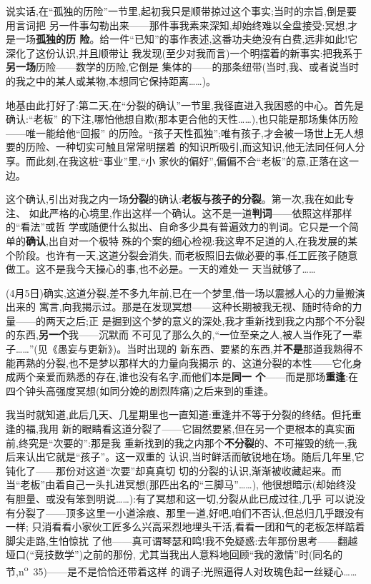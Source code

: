 说实话,在“孤独的历险”一节里,起初我只是顺带掠过这个事实;当时的宗旨,倒是要用言词把
另一件事勾勒出来——那件事我素来深知,却始终难以全盘接受:冥想,才是一场\textbf{孤独的}\textbf{历
险}。给一件“已知”的事作表述,这番功夫绝没有白费,远非如此!它深化了这份认识,并且顺带让
我发现(至少对我而言)一个明摆着的新事实:把我系于\textbf{另一场}历险——数学的历险,它倒是
集体的——的那条纽带(当时,我、或者说当时的我之中的某人或某物,本想同它保持距离……)。

地基由此打好了:第二天,在“分裂的确认”一节里,我径直进入我困惑的中心。首先是确认:“老板”
的下注,哪怕他想自欺(那本更合他的天性……),也只能是那场集体历险——唯一能给他“回报”
的历险。“孩子天性孤独”;\dmark{}唯有孩子,才会被一场世上无人想要的历险、一种切实可触且常常明摆着
的知识所吸引,而这知识,他无法同任何人分享。而此刻,在我这桩“事业”里,“小
家伙的偏好”,偏偏不合“老板”的意,正落在这一边。

这个确认,引出对我之内一场\textbf{分裂}的确认:\textbf{老板与孩子的分裂}。第一次,我在如此专注、
如此严格的心境里,作出这样一个确认。这不是一道\textbf{判词}——依照这样那样的“看法”或哲
学或随便什么拟出、自命多少具有普遍效力的判词。它只是一个简单的\textbf{确认},出自对一个极特
殊的个案的细心检视:我这卑不足道的人,在我发展的某个阶段。也许有一天,这道分裂会消失,
而老板照旧去做必要的事,任工匠孩子随意做工。这不是我今天操心的事,也不必是。一天的难处一
天当就够了……

(4月5日)确实,这道分裂,差不多九年前,已在一个梦里,借一场以震撼人心的力量搬演出来的
寓言,向我揭示过。那是在发现冥想——这种长期被我无视、随时待命的力量——的两天之后;正
是掘到这个梦的意义的深处,我才重新找到我之内那个不分裂的东西,\textbf{另一个}我——沉默而
不可见了那么久的,“一位至亲之人,被人当作死了一辈子……”(见《愚妄与更新》)。当时出现的
新东西、要紧的东西,并\textbf{不是}那道我熟得不能再熟的分裂,也不是梦以那样大的力量向我揭示
的、这道分裂的本性——它化身成两个亲爱而熟悉的存在,谁也没有名字,而他们本是\textbf{同一
个}——而是那场\textbf{重逢}:在四个钟头高强度冥想(如同分娩的剧烈阵痛)之后来到的重逢。

我当时就知道,此后几天、几星期里也一直知道:重逢并不等于分裂的终结。但托重逢的福,我用
新的眼睛看这道分裂了——它固然要紧,但在另一个更根本的真实面前,终究是“次要的”:那是我
重新找到的我之内那个\textbf{不分裂}的、不可摧毁的统一,我后来认出它就是“孩子”。这一双重的
\dmark{}认识,当时鲜活而敏锐地在场。随后几年里,它钝化了——那份对这道“次要”却真真切
切的分裂的认识,渐渐被收藏起来。而当“老板”由着自己一头扎进冥想(那匹出名的“三脚马”……),
他很想暗示(却始终没有胆量、或没有笨到明说……):有了冥想和这一切,分裂从此已成过往,几乎
可以说没有分裂了——顶多这里一小道涂痕、那里一道,好吧,咱们不否认,但总归几乎跟没有一样;
只消看看小家伙工匠多么兴高采烈地埋头干活,看看一团和气的老板怎样踮着脚尖走路,生怕惊扰
了他——真可谓琴瑟和鸣!我不免疑惑:去年那份思考——翻越垭口(“竞技数学”)之前的那份,
尤其当我出人意料地回顾“我的激情”时(同名的节,n\textsuperscript{o}~35)——是不是恰恰还带着这样
的调子:光照逼得人对玫瑰色起一丝疑心……

